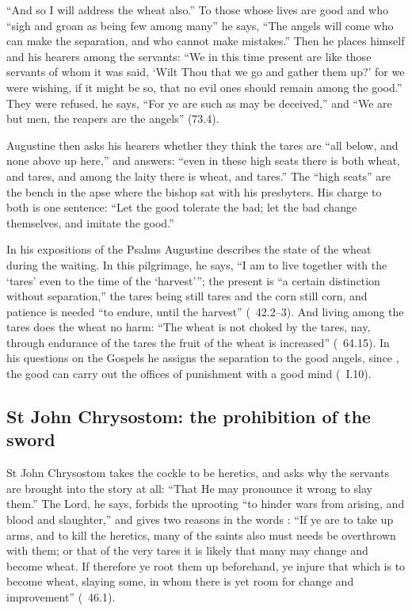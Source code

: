 ``And so I will address the wheat also.'' To those whose lives are good and
who ``sigh and groan as being few among many'' he says, ``The angels will
come who can make the separation, and who cannot make mistakes.'' Then he
places himself and his hearers among the servants: ``We in this time present
are like those servants of whom it was said, `Wilt Thou that we go and gather
them up?' for we were wishing, if it might be so, that no evil ones should
remain among the good.'' They were refused, he says, ``For ye are such as may
be deceived,'' and ``We are but men, the reapers are the angels'' (73.4).

Augustine then asks his hearers whether they think the tares are ``all below,
and none above up here,'' and answers: ``even in these high seats there is
both wheat, and tares, and among the laity there is wheat, and tares.'' The
``high seats'' are the bench in the apse where the bishop sat with his
presbyters. His charge to both is one sentence: ``Let the good tolerate the
bad; let the bad change themselves, and imitate the good.''

In his expositions of the Psalms Augustine describes the state of the wheat
during the waiting. In this pilgrimage, he says, ``I am to live together with
the `tares' even to the time of the `harvest'''; the present is ``a certain
distinction without separation,'' the tares being still tares and the corn
still corn, and patience is needed ``to endure, until the harvest''
(\ 42.2--3). And living among the tares does the wheat no
harm: ``The wheat is not choked by the tares, nay, through endurance of the
tares the fruit of the wheat is increased'' (\ 64.15). In
his questions on the Gospels he assigns the separation to the good angels,
since , the good can
carry out the offices of punishment with a good mind (\
I.10).

\subsection{St John Chrysostom: the prohibition of the sword}
\label{sec:patience-chrysostom}

St John Chrysostom takes the cockle to be heretics, and asks why the servants
are brought into the story at all: ``That He may pronounce it wrong to slay
them.'' The Lord, he says, forbids the uprooting ``to hinder wars from arising,
and blood and slaughter,'' and gives two reasons in the words \latin{ne forte
\dots\ eradicetis}: ``If ye are to take up arms, and to kill the heretics,
many of the saints also must needs be overthrown with them; or that of the
very tares it is likely that many may change and become wheat. If therefore ye
root them up beforehand, ye injure that which is to become wheat, slaying
some, in whom there is yet room for change and improvement'' (\work{Hom.\ in
Mt.}\ 46.1).

